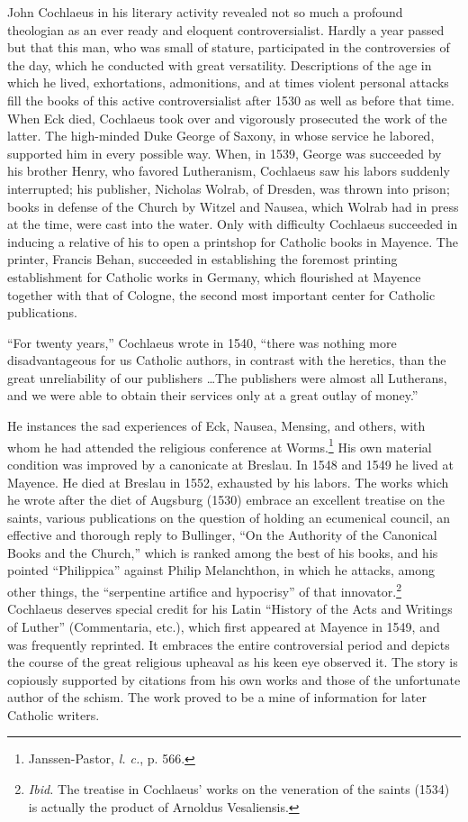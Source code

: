 John Cochlaeus in his literary activity revealed not so much a
profound theologian as an ever ready and eloquent controversialist.
Hardly a year passed but that this man, who was small of stature,
participated in the controversies of the day, which he conducted with
great versatility. Descriptions of the age in which he lived, exhortations,
admonitions, and at times violent personal attacks fill the books
of this active controversialist after 1530 as well as before that time.
When Eck died, Cochlaeus took over and vigorously prosecuted the
work of the latter. The high-minded Duke George of Saxony, in whose
service he labored, supported him in every possible way. When, in
1539, George was succeeded by his brother Henry, who favored Lutheranism,
Cochlaeus saw his labors suddenly interrupted; his publisher, Nicholas
Wolrab, of Dresden, was thrown into prison; books in
defense of the Church by Witzel and Nausea, which Wolrab had in
press at the time, were cast into the water. Only with difficulty
Cochlaeus succeeded in inducing a relative of his to open a printshop
for Catholic books in Mayence. The printer, Francis Behan,
succeeded in establishing the foremost printing establishment for
Catholic works in Germany, which flourished at Mayence together
with that of Cologne, the second most important center for Catholic
publications.

“For twenty years,” Cochlaeus wrote in 1540, “there was nothing
more disadvantageous for us Catholic authors, in contrast with the
heretics, than the great unreliability of our publishers \dots The publishers
were almost all Lutherans, and we were able to obtain their
services only at a great outlay of money.”

He instances the sad experiences of Eck, Nausea, Mensing, and
others, with whom he had attended the religious conference at
Worms.\footnote{Janssen-Pastor, \textit{l. c.}, p. 566.}
 His own material condition was improved by a canonicate
at Breslau. In 1548 and 1549 he lived at Mayence. He died at
Breslau in 1552, exhausted by his labors. The works which he wrote
after the diet of Augsburg (1530) embrace an excellent treatise on
the saints, various publications on the question of holding an ecumenical
council, an effective and thorough reply to Bullinger, “On
the Authority of the Canonical Books and the Church,” which is
ranked among the best of his books, and his pointed “Philippica”
against Philip Melanchthon, in which he attacks, among other things,
the “serpentine artifice and hypocrisy” of that innovator.\footnote{\textit{Ibid.} The treatise in Cochlaeus’ works on the veneration of the saints (1534) is
actually the product of Arnoldus Vesaliensis.}
Cochlaeus
deserves special credit for his Latin “History of the Acts and Writings
of Luther” (Commentaria, etc.), which first appeared at Mayence in 1549,
and was frequently reprinted. It embraces the entire
controversial period and depicts the course of the great religious upheaval
as his keen eye observed it. The story is copiously supported by
citations from his own works and those of the unfortunate author of
the schism. The work proved to be a mine of information for later
Catholic writers.


